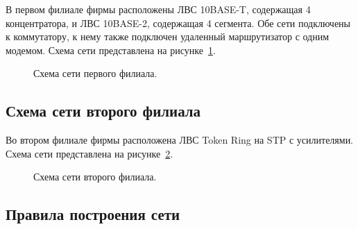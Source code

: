 В первом филиале фирмы расположены ЛВС 10BASE-T, содержащая 4 концентратора, и ЛВС 10BASE-2, содержащая 4 сегмента. Обе сети подключены к коммутатору, к нему также подключен удаленный маршрутизатор с одним модемом. Схема сети представлена на рисунке~\ref{pic:3_4}.

\begin{figure}[h]
\caption{Схема сети первого филиала.}
\label{pic:3_4}
\end{figure}

\newpage

\subsection{Схема сети второго филиала}

Во втором филиале фирмы расположена ЛВС Token Ring на STP с усилителями. Схема сети представлена на рисунке~\ref{pic:3_5}.

\begin{figure}[h]
\caption{Схема сети второго филиала.}
\label{pic:3_5}
\end{figure}

\newpage

\subsection{Правила построения сети}

